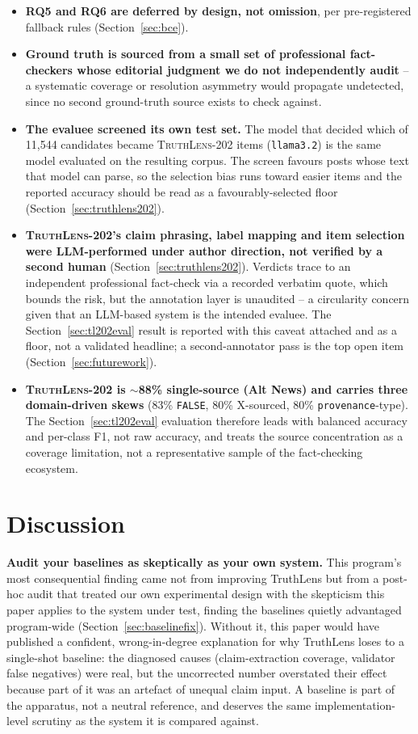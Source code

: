 \documentclass[conference]{IEEEtran}
\begin{document}
\begin{itemize}
  open.
\item \textbf{RQ5 and RQ6 are deferred by design, not omission}, per
  pre-registered fallback rules (Section~\ref{sec:bce}).
\item \textbf{Ground truth is sourced from a small set of professional
  fact-checkers whose editorial judgment we do not independently
  audit} -- a systematic coverage or resolution asymmetry would
  propagate undetected, since no second ground-truth source exists to
  check against.
\item \textbf{The evaluee screened its own test set.} The model that
  decided which of 11{,}544 candidates became \textsc{TruthLens-202}
  items (\texttt{llama3.2}) is the same model evaluated on the resulting
  corpus. The screen favours posts whose text that model can parse, so
  the selection bias runs toward easier items and the reported accuracy
  should be read as a favourably-selected floor
  (Section~\ref{sec:truthlens202}).
\item \textbf{\textsc{TruthLens-202}'s claim phrasing, label mapping and
  item selection were LLM-performed under author direction, not verified
  by a second human} (Section~\ref{sec:truthlens202}). Verdicts trace to
  an independent professional fact-check via a recorded verbatim quote,
  which bounds the risk, but the annotation layer is unaudited --
  a circularity concern given that an LLM-based system is the intended
  evaluee. The Section~\ref{sec:tl202eval} result is reported with this
  caveat attached and as a floor, not a validated headline; a
  second-annotator pass is the top open item
  (Section~\ref{sec:futurework}).
\item \textbf{\textsc{TruthLens-202} is $\sim$88\% single-source (Alt
  News) and carries three domain-driven skews} (83\% \texttt{FALSE},
  80\% X-sourced, 80\% \texttt{provenance}-type). The
  Section~\ref{sec:tl202eval} evaluation therefore leads with balanced
  accuracy and per-class F1, not raw accuracy, and treats the source
  concentration as a coverage limitation, not a representative sample
  of the fact-checking ecosystem.
\end{itemize}

\section{Discussion}
\label{sec:discussion}

\textbf{Audit your baselines as skeptically as your own system.} This
program's most consequential finding came not from improving TruthLens
but from a post-hoc audit that treated our own experimental design with
the skepticism this paper applies to the system under test, finding the
baselines quietly advantaged program-wide
(Section~\ref{sec:baselinefix}). Without it, this paper would have
published a confident, wrong-in-degree explanation for why TruthLens
loses to a single-shot baseline: the diagnosed causes (claim-extraction
coverage, validator false negatives) were real, but the uncorrected
number overstated their effect because part of it was an artefact of
unequal claim input. A baseline is part of the apparatus, not a neutral
reference, and deserves the same implementation-level scrutiny as the
system it is compared against.
\end{document}
